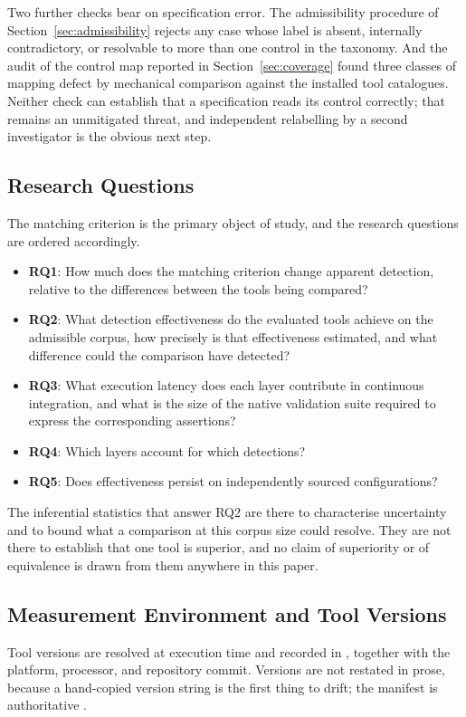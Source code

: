 \documentclass[smallextended]{svjour3}
\begin{document}
Two further checks bear on specification error. The admissibility procedure of
Section~\ref{sec:admissibility} rejects any case whose label is absent,
internally contradictory, or resolvable to more than one control in the taxonomy.
And the audit of the control map reported in Section~\ref{sec:coverage} found
three classes of mapping defect by mechanical comparison against the installed
tool catalogues. Neither check can establish that a specification reads its
control correctly; that remains an unmitigated threat, and independent
relabelling by a second investigator is the obvious next step.

\subsection{Research Questions}
The matching criterion is the primary object of study, and the research questions
are ordered accordingly.
\begin{itemize}
\item \textbf{RQ1}: How much does the matching criterion change apparent
detection, relative to the differences between the tools being compared?
\item \textbf{RQ2}: What detection effectiveness do the evaluated tools achieve
on the admissible corpus, how precisely is that effectiveness estimated, and what
difference could the comparison have detected?
\item \textbf{RQ3}: What execution latency does each layer contribute in
continuous integration, and what is the size of the native validation suite
required to express the corresponding assertions?
\item \textbf{RQ4}: Which layers account for which detections?
\item \textbf{RQ5}: Does effectiveness persist on independently sourced
configurations?
\end{itemize}

The inferential statistics that answer RQ2 are there to characterise uncertainty
and to bound what a comparison at this corpus size could resolve. They are not
there to establish that one tool is superior, and no claim of superiority or of
equivalence is drawn from them anywhere in this paper.

\subsection{Measurement Environment and Tool Versions}
\label{sec:environment}
Tool versions are resolved at execution time and recorded in
, together with the platform, processor, and
repository commit. Versions are not restated in prose, because a hand-copied
version string is the first thing to drift; the manifest is authoritative
\citep{bohme2022reliability}.
\end{document}
